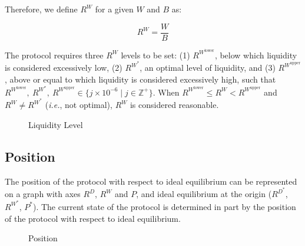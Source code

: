 \documentclass[tikz]{article}
\makeatletter
\newenvironment{keepunit}{%
  \par\penalty0\begingroup
  \edef\keepunitparskip{\the\parskip}%
  \noindent\begin{minipage}[t]{\linewidth}%
  \setlength{\parskip}{\keepunitparskip}%
  \@minipagefalse
}{%
  \end{minipage}\par\endgroup
}
\makeatother
\begin{document}
\begin{keepunit}
Therefore, we define $R^{W}$ for a given $W$ and $B$ as:

    $$
        R^{W} = \frac{W}{B}
    $$
\end{keepunit}

 

\begin{keepunit}
The protocol requires three $R^{W}$ levels to be set: (1) $R^{W^{\text{lower}}}$, below which liquidity is considered excessively low, (2) $R^{W^{*}}$, an optimal level of liquidity, and (3) $R^{W^{\text{upper}}}$, above or equal to which liquidity is considered excessively high, such that $R^{W^{\text{lower}}},\ R^{W^{*}},\ R^{W^{\text{upper}}} \in \{j \times 10^{-6} \mid j \in \mathbb{Z}^{+} \}$. When $R^{W^{\text{lower}}} \leq R^{W} < R^{W^{\text{upper}}}$ and $R^{W} \neq R^{W^{*}}$ (\textit{i.e.}, not optimal), $R^{W}$ is considered reasonable.

\begin{figure}[H]
    \centering
    
    \vspace*{-7mm}
    \setlength{\belowcaptionskip}{0pt}
    \caption{Liquidity Level}
    \label{Liquidity Level}
\end{figure}
\end{keepunit}




\begin{keepunit}
\subsection{Position}

The position of the protocol with respect to ideal equilibrium can be represented on a graph with axes $R^{D}$, $R^{W}$ and $P$, and ideal equilibrium at the origin ($R^{D^{*}}$, $R^{W^{*}}$, $P^{*}$). The current state of the protocol is determined in part by the position of the protocol with respect to ideal equilibrium. 


\begin{figure}[H]
    \centering
    \resizebox{0.95\textwidth}{!}{}
    \caption{Position}
    \label{Position}
\end{figure}
\end{keepunit}
\end{document}
